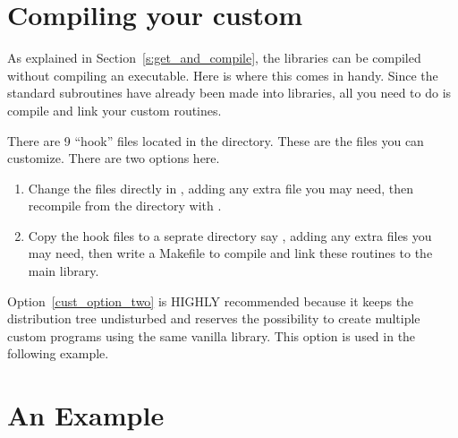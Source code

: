 \section{Compiling your custom \tao}

As explained in Section~\ref{s:get_and_compile}, the \tao libraries can be
compiled without compiling an executable. Here is where this comes in handy. Since
the standard \tao subroutines have already been made into libraries, all you
need to do is compile and link your custom routines.

There are 9 ``hook'' files located in the  directory. These are
the files you can customize. There are two options here. 
\begin{enumerate}
  \item Change the files directly in , adding any extra file you
may need, then recompile from the  directory with .
\label{cust_optiin_one}
  \item Copy the hook files to a seprate directory say ,
adding any extra files you may need, then write a Makefile to compile and link these
routines to the main \tao library.
\label{cust_option_two}
\end{enumerate}
Option~\ref{cust_option_two} is HIGHLY recommended because it keeps the \tao
distribution tree undisturbed and reserves the possibility to create multiple
custom \tao programs using the same vanilla \tao library. This option is used in
the following example.

\section{An Example}

